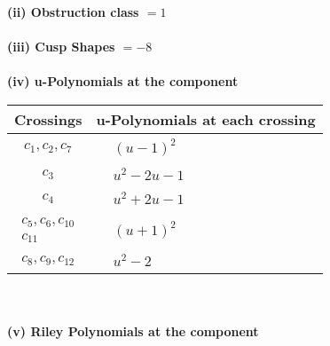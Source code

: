 \documentclass[1p]{elsarticle_modified}
\theoremstyle{definition}
\begin{document}
\flushleft \textbf{(ii) Obstruction class $= 1$}\\~\\
\flushleft \textbf{(iii) Cusp Shapes $= -8$}\\~\\
\newpage\renewcommand{\arraystretch}{1}
\flushleft \textbf{(iv) u-Polynomials at the component}\newline \\
\begin{tabular}{m{50pt}|m{274pt}}
Crossings & \hspace{64pt}u-Polynomials at each crossing \\
\hline $$\begin{aligned}c_{1},c_{2},c_{7}\end{aligned}$$&$\begin{aligned}
&(u-1)^2
\end{aligned}$\\
\hline $$\begin{aligned}c_{3}\end{aligned}$$&$\begin{aligned}
&u^2-2 u-1
\end{aligned}$\\
\hline $$\begin{aligned}c_{4}\end{aligned}$$&$\begin{aligned}
&u^2+2 u-1
\end{aligned}$\\
\hline $$\begin{aligned}c_{5},c_{6},c_{10}\\c_{11}\end{aligned}$$&$\begin{aligned}
&(u+1)^2
\end{aligned}$\\
\hline $$\begin{aligned}c_{8},c_{9},c_{12}\end{aligned}$$&$\begin{aligned}
&u^2-2
\end{aligned}$\\
\hline
\end{tabular}\\~\\
\newpage\renewcommand{\arraystretch}{1}
\flushleft \textbf{(v) Riley Polynomials at the component}\newline \\
\end{document}
